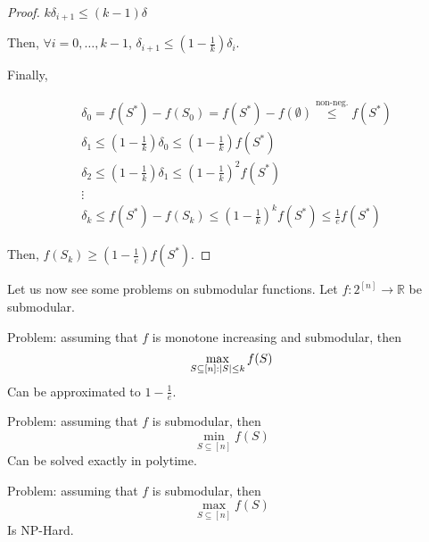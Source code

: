 \begin{proof}
        $k \delta_{i+1} \leq (k-1) \delta$

        Then, $\forall i = 0, \dots, k-1$, $\delta_{i+1} \leq (1 - \frac{1}{k}) \delta_i$.

        Finally,

        \begin{equation*}
            \begin{split}
                &\delta_0 = f(S^*) - f(S_0) = f(S^*) - f(\emptyset) \overset{\text{non-neg.}}{\leq} f(S^*)\\
                & \delta_1 \leq (1 - \frac{1}{k}) \delta_0 \leq (1 - \frac{1}{k}) f(S^*)\\
                & \delta_2 \leq (1 - \frac{1}{k}) \delta_1 \leq (1 - \frac{1}{k})^2 f(S^*)\\
                & \vdots\\
                & \delta_k \leq f(S^*) - f(S_k) \leq (1 - \frac{1}{k})^k f(S^*) \leq \frac{1}{e} f(S^*) 
            \end{split}
        \end{equation*}

        Then, $f(S_k) \geq (1 - \frac{1}{e}) f(S^*)$.
    \end{proof}

    Let us now see some problems on submodular functions.
    Let $f : 2^{[n]} \rightarrow \mathbb{R}$ be submodular.

    Problem: assuming that $f$ is monotone increasing and submodular, then
    \[ \max_{S \subseteq [n] : \vert S \vert \leq k} f(S) \]
    Can be approximated to $1 - \frac{1}{e}$.

    Problem: assuming that $f$ is submodular, then
    \[ \min_{S \subseteq [n]} f(S) \]
    Can be solved exactly in polytime.

    Problem: assuming that $f$ is submodular, then
    \[ \max_{S \subseteq [n]} f(S) \]
    Is NP-Hard.